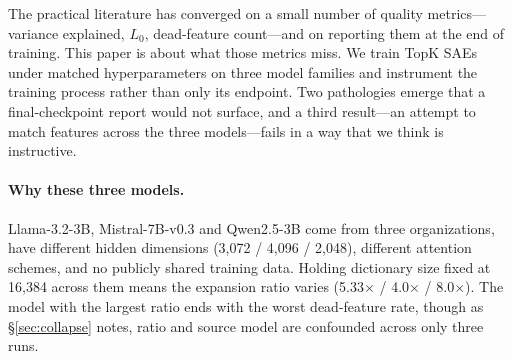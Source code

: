 \documentclass[11pt]{article}
\begin{document}
The practical literature has converged on a small number of quality metrics---variance
explained, $L_0$, dead-feature count---and on reporting them at the end of training.
This paper is about what those metrics miss. We train TopK SAEs \citep{gao2024scaling}
under matched hyperparameters on three model families and instrument the training
process rather than only its endpoint. Two pathologies emerge that a final-checkpoint
report would not surface, and a third result---an attempt to match features across the
three models---fails in a way that we think is instructive.

\paragraph{Why these three models.} Llama-3.2-3B, Mistral-7B-v0.3 and Qwen2.5-3B come
from three organizations, have different hidden dimensions (3{,}072 / 4{,}096 /
2{,}048), different attention schemes, and no publicly shared training data. Holding
dictionary size fixed at 16{,}384 across them means the expansion ratio varies
(5.33$\times$ / 4.0$\times$ / 8.0$\times$). The model with the largest ratio ends with
the worst dead-feature rate, though as \S\ref{sec:collapse} notes, ratio and source
model are confounded across only three runs.
\end{document}
